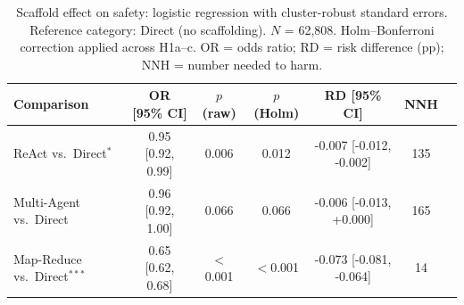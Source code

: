 
\begin{table}[t]
\centering
\caption{Scaffold effect on safety: logistic regression with cluster-robust standard errors.
Reference category: Direct (no scaffolding). $N$ = 62,808. Holm--Bonferroni correction applied across H1a--c.
OR = odds ratio; RD = risk difference (pp); NNH = number needed to harm.}
\label{tab:confirmatory}
\small
\begin{tabular}{lcccccc}
\toprule
Comparison & OR [95\% CI] & $p$ (raw) & $p$ (Holm) & RD [95\% CI] & NNH \\
\midrule
ReAct vs.\ Direct$^{*}$ & 0.95 [0.92, 0.99] & 0.006 & 0.012 & -0.007 [-0.012, -0.002] & 135 \\
Multi-Agent vs.\ Direct & 0.96 [0.92, 1.00] & 0.066 & 0.066 & -0.006 [-0.013, +0.000] & 165 \\
Map-Reduce vs.\ Direct$^{***}$ & 0.65 [0.62, 0.68] & $<$0.001 & $<$0.001 & -0.073 [-0.081, -0.064] & 14 \\
\bottomrule
\end{tabular}
\end{table}
